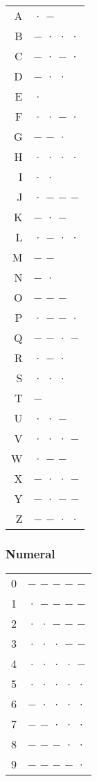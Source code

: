 		\begin{tabular}{rl}
			A & · − \\ 
			B & − · · · \\ 
			C & − · − ·  \\ 
			D & − · ·  \\ 
			E & ·  \\ 
			F & · · − ·  \\ 
			G & − − ·  \\ 
			H & · · · ·  \\ 
			I & · ·  \\ 
			J & · − − −  \\ 
			K & − · −  \\ 
			L & · − · ·  \\ 
			M & − −  \\ 
			N & − ·  \\ 
			O & − − −  \\
			P & · − − ·  \\
			Q & − − · −  \\ 
			R & · − ·  \\ 
			S & · · ·  \\ 
			T & −  \\ 
			U & · · −  \\ 
			V & · · · −  \\ 
			W & · − −  \\ 
			X & − · · −  \\ 
			Y & − · − −  \\ 
			Z & − − · ·  \\ 
		\end{tabular}
	
	\subsubsection*{Numeral}
	
		\begin{tabular}{rl}
			0 & − − − − − \\ 
			1 & · − − − − \\ 
			2 & · · − − − \\ 
			3 & · · · − − \\ 
			4 & · · · · − \\ 
			5 & · · · · · \\ 
			6 & − · · · · \\ 
			7 & − − · · · \\
			8 & − − − · · \\ 
			9 & − − − − · \\ 
		\end{tabular}
	
